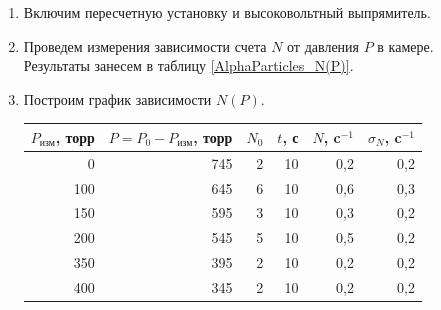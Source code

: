	\begin{enumerate}
		\item Включим пересчетную установку и высоковольтный выпрямитель.
		
		\item Проведем измерения зависимости счета $N$ от давления $P$ в камере. Результаты занесем в таблицу \ref{AlphaParticles_N(P)}.
		
		\item Построим график зависимости $N(P)$.
		
		\newpage
		\begin{table}[h!]
			\centering
				\begin{tabular}{|r|r|r|r|r|r|}
					\hline
					\multicolumn{1}{|c|}{$P_\text{изм}$, торр} & \multicolumn{1}{c|}{$P = P_0 - P_\text{изм}$, торр} & \multicolumn{1}{c|}{$N_0$} & \multicolumn{1}{c|}{$t$, с} & \multicolumn{1}{c|}{$N$, c$^{-1}$} & \multicolumn{1}{c|}{$\sigma_N$, c$^{-1}$} \\ \hline
					0                                                 & 745                                                        & 2                          & 10                          & 0,2                                & 0,2                                       \\ \hline
					100                                               & 645                                                        & 6                          & 10                          & 0,6                                & 0,3                                       \\ \hline
					150                                               & 595                                                        & 3                          & 10                          & 0,3                                & 0,2                                       \\ \hline
					200                                               & 545                                                        & 5                          & 10                          & 0,5                                & 0,2                                       \\ \hline
					350                                               & 395                                                        & 2                          & 10                          & 0,2                                & 0,2                                       \\ \hline
					400                                               & 345                                                        & 2                          & 10                          & 0,2                                & 0,2                                       \\ \hline

\end{tabular}
\end{table}
\end{enumerate}

